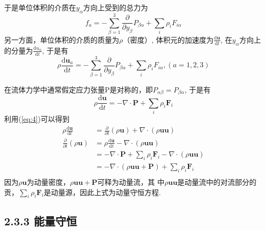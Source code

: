 \documentclass[10pt,aspectratio=43,mathserif,table]{ctexbeamer}
\newcommand{\customref}[1]{(\ref{#1})}
\begin{document}
\begin{frame}
    于是单位体积的介质在$y_\alpha$方向上受到的总力为
    $$
    f_a=-\sum_{\beta =1}^3{\frac{\partial}{\partial y_{\beta}}P_{\beta \alpha}}+\sum_i{\rho _iF_{i\alpha}}
    $$
    另一方面，单位体积的介质的质量为$\rho$（密度）, 体积元的加速度为$\frac{\mathrm{d}\mathbf{u}}{\mathrm{d}t}$, 在$y_\alpha$方向上的分量为$\frac{\mathrm{d}u_{\alpha}}{\mathrm{d}t}$, 于是有
    \begin{equation}\label{eq:4.9}
        \rho \frac{\mathrm{d}\mathbf{u}_a}{\mathrm{d}t}=-\sum_{\beta =1}^3{\frac{\partial}{\partial y_{\beta}}P_{\beta \alpha}}+\sum_i{\rho _iF_{i\alpha}}, \left( a=1,2,3 \right) 
    \end{equation}
\end{frame}

\begin{frame}
    在流体力学中通常假定应力张量P是对称的，即$P_{\alpha \beta}=P_{\beta \alpha}$, 于是有
    $$
    \rho \frac{\mathrm{d}\mathbf{u}}{\mathrm{d}t}=-\nabla \cdot \mathbf{P}+\sum_i{\rho _i\mathbf{F}_i}
    $$
    利用\customref{eq:4}可以得到
    $$
    \begin{aligned}
        \rho \frac{\mathrm{d}\mathbf{u}}{\mathrm{d}t}&=\frac{\partial}{\partial t}\left( \rho \mathbf{u} \right) +\nabla \cdot \left( \rho \mathbf{uu} \right)\\
        \frac{\partial}{\partial t}\left( \rho \mathbf{u} \right) &=\rho \frac{\mathrm{d}\mathbf{u}}{\mathrm{d}t}-\nabla \cdot \left( \rho \mathbf{uu} \right)\\
        &=-\nabla \cdot \mathbf{P}+\sum_i{\rho _i\mathbf{F}_i}-\nabla \cdot \left( \rho \mathbf{uu} \right)\\
        &=-\nabla \cdot \left( \rho \mathbf{uu}+\mathbf{P} \right) +\sum_i{\rho _i\mathbf{F}_i}\\
    \end{aligned}
    $$
    因为$\rho\mathbf{u}$为动量密度，$\rho \mathbf{uu}+\mathbf{P}$可释为动量流，其
    中$\rho \mathbf{uu}$是动量流中的对流部分的贡，$\sum_i{\rho _i\mathbf{F}_i}$是动量源，因此上式为动量守恒方程.
\end{frame}

\subsection{2.3.3 能量守恒}
\end{document}
